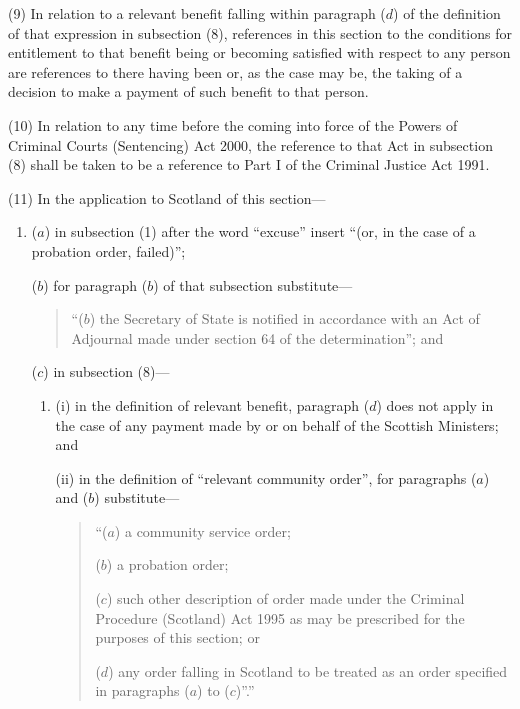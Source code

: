 \documentclass[12pt,a4paper]{article}
\begin{document}
(9) In relation to a relevant benefit falling within paragraph ($d$)  of the definition of that expression in subsection (8), references in this section to the conditions for entitlement to that benefit being or becoming satisfied with respect to any person are references to there having been or, as the case may be, the taking of a decision to make a payment of such benefit to that person.

(10) In relation to any time before the coming into force of the Powers of Criminal Courts (Sentencing) Act 2000, the reference to that Act in subsection (8)  shall be taken to be a reference to Part I of the Criminal Justice Act 1991. 

(11) In the application to Scotland of this section—
\begin{enumerate}\item[]
($a$) in subsection (1)  after the word “excuse” insert “(or, in the case of a probation order, failed)”;

($b$) for paragraph ($b$)  of that subsection substitute—
\begin{quotation}
“($b$) the Secretary of State is notified in accordance with an Act of Adjournal made under section 64 of the determination”; and
\end{quotation}

($c$) in subsection (8)—
\begin{enumerate}\item[]
(i) in the definition of relevant benefit, paragraph ($d$)  does not apply in the case of any payment made by or on behalf of the Scottish Ministers; and

%

(ii) in the definition of “relevant community order”, for paragraphs ($a$) 
and ($b$)  %
substitute—
\begin{quotation}
“($a$) a community service order;

($b$) a probation order;

($c$) such other description of order made under the Criminal Procedure (Scotland) Act 1995 as may be prescribed for the purposes of this section; or

($d$) any order falling in Scotland to be treated as an order specified in paragraphs ($a$) to ($c$)”.”
\end{quotation}
\end{enumerate}
\end{enumerate}
\end{document}
